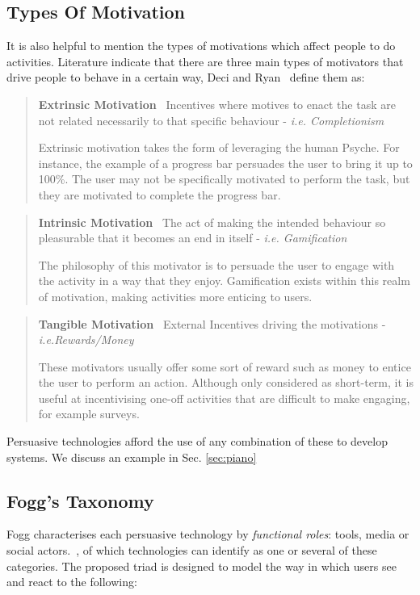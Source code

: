 \subsection{Types Of Motivation}
It is also helpful to mention the types of motivations which affect people to do activities. Literature indicate that there are three main types of motivators that drive people to behave in a certain way, Deci and Ryan~\cite{motivationtypes} define them as:
\begin{quotation}
\noindent
\textbf{Extrinsic Motivation}~ Incentives where motives to enact the task are not related necessarily to that specific behaviour - \textit{i.e. Completionism}

Extrinsic motivation takes the form of leveraging the human Psyche. For instance, the example of a progress bar persuades the user to bring it up to 100\%. The user may not be specifically motivated to perform the task, but they are motivated to complete the progress bar.
\end{quotation}
\begin{quotation}
\noindent
\textbf{Intrinsic Motivation}~ The act of making the intended behaviour so pleasurable that it becomes an end in itself - \textit{i.e. Gamification}

The philosophy of this motivator is to persuade the user to engage with the activity in a way that they enjoy. Gamification exists within this realm of motivation, making activities more enticing to users.
\end{quotation}
\begin{quotation}
\noindent
\textbf{Tangible Motivation}~ External Incentives driving the motivations - \textit{i.e.Rewards/Money}

These motivators usually offer some sort of reward such as money to entice the user to perform an action. Although only considered as short-term, it is useful at incentivising one-off activities that are difficult to make engaging, for example surveys. 
\end{quotation}

Persuasive technologies afford the use of any combination of these to develop systems. We discuss an example in Sec. \ref{sec:piano}

\subsection{Fogg's Taxonomy}
Fogg characterises each persuasive technology by \emph{functional roles}: tools, media or social actors.~\cite{fogg1998persuasive}, of which technologies can identify as one or several of these categories. The proposed triad is designed to model the way in which users see and react to the following:

